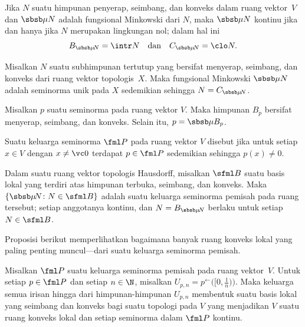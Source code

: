 \begin{prop} Jika $N$ suatu himpunan penyerap, seimbang, dan konveks dalam ruang vektor~$V$ dan $\sbsb \mu N$ adalah fungsional Minkowski dari $N$, maka
$\sbsb \mu N$ kontinu jika dan hanya jika $N$ merupakan lingkungan nol; dalam hal ini
  \[ B_{\sbsb \mu{\!N}} = \intr N \quad \text{dan} \quad  C_{\sbsb \mu{\!N}} = \clo N. \]
\end{prop}

\begin{cor} Misalkan $N$ suatu subhimpunan tertutup yang bersifat menyerap, seimbang, dan konveks dari ruang vektor topologis~$X$. Maka fungsional Minkowski
$\sbsb \mu N$ adalah seminorma unik pada $X$ sedemikian sehingga $N = C_{\sbsb \mu{\!N}}$.
\end{cor}

\begin{prop} Misalkan $p$ suatu seminorma pada ruang vektor $V$. Maka himpunan $B_p$ bersifat menyerap, seimbang, dan konveks. Selain itu, $p = \sbsb \mu{B_p}$.
\end{prop}

\begin{defn} Suatu keluarga seminorma $\fml P$ pada ruang vektor $V$ disebut
 jika untuk setiap $x \in V$ dengan $x \ne \vc 0$ terdapat $p \in \fml P$ sedemikian sehingga $p(x) \ne 0$.
\end{defn}

\begin{prop} Dalam suatu ruang vektor topologis Hausdorff, misalkan $\sfml B$ suatu basis lokal yang terdiri atas himpunan terbuka, seimbang, dan konveks. Maka
$\{\sbsb \mu{\!N}\colon N \in \sfml B\}$ adalah suatu keluarga seminorma pemisah pada ruang tersebut; setiap anggotanya kontinu, dan
$N = B_{\sbsb \mu{\!N}}$ berlaku untuk setiap $N \in \sfml B$.
\end{prop}

Proposisi berikut memperlihatkan bagaimana banyak ruang konveks lokal yang paling penting muncul---dari suatu keluarga
seminorma pemisah.

\begin{prop}\label{prop_clbase_from_snorms} Misalkan $\fml P$ suatu keluarga seminorma pemisah pada ruang vektor~$V$. Untuk setiap
$p \in \fml P$ dan setiap $n \in \N$, misalkan $U_{p,n} = p^{\gets}\bigl([0,\frac1n)\bigr)$. Maka keluarga semua irisan hingga
dari himpunan-himpunan $U_{p,n}$ membentuk suatu basis lokal yang seimbang dan konveks bagi suatu topologi pada $V$ yang menjadikan $V$
suatu ruang konveks lokal dan setiap seminorma dalam $\fml P$ kontinu.
\end{prop}

